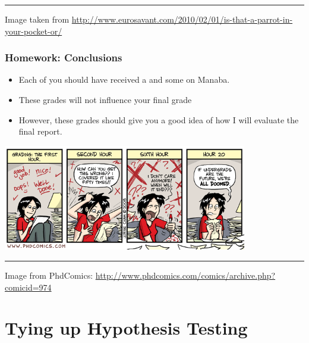 \documentclass[10pt]{beamer}
\begin{document}
\begin{frame}
  
  \vfill
  
  \hrule {\tiny Image taken from
    \url{http://www.eurosavant.com/2010/02/01/is-that-a-parrot-in-your-pocket-or/}}
\end{frame}

\begin{frame}
  \frametitle{Homework: Conclusions}
  \begin{itemize}
    \item Each of you should have received a  and
      some  on Manaba.
      \bigskip

    \item These grades \alert{will not} influence your final grade
      \bigskip

    \item However, these grades should give you a good idea of how I
      will evaluate the final report.
      \bigskip

  \end{itemize}

  \begin{center}
    \includegraphics[width=0.8\textwidth]{img/phd}
  \end{center}

  \hrule
      {\tiny Image from PhdComics: \url{http://www.phdcomics.com/comics/archive.php?comicid=974}}
\end{frame}

\section{Tying up Hypothesis Testing}
\end{document}
